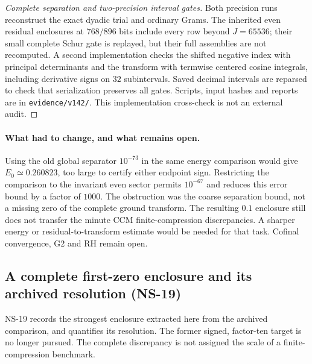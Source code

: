 \documentclass[11pt]{article}
\theoremstyle{remark}
\begin{document}
\begin{proof}[Complete separation and two-precision interval gates]
Both precision runs reconstruct the exact dyadic trial and ordinary
Grams. The inherited even residual enclosures at $768/896$ bits
include every row beyond $J=65536$; their small complete Schur gate
is replayed, but their full assemblies are not recomputed.
A second implementation checks the shifted negative index with
principal determinants and the transform with termwise centered
cosine integrals, including derivative signs on $32$ subintervals.
Saved decimal intervals are reparsed to check that serialization
preserves all gates. Scripts, input hashes and reports are in
\texttt{evidence/v142/}. This implementation cross-check is not an
external audit.
\end{proof}

\paragraph{What had to change, and what remains open.}
Using the old global separator $10^{-73}$ in the same energy comparison
would give $E_0\simeq0.260823$, too large to certify either endpoint
sign. Restricting the comparison to the invariant even sector permits
$10^{-67}$ and reduces this error bound by a factor of $1000$.
The obstruction was the coarse separation bound, not a missing zero
of the complete ground transform. The resulting $0.1$ enclosure
still does not transfer the minute CCM finite-compression discrepancies.
A sharper energy or residual-to-transform estimate would be needed
for that task. Cofinal convergence, G2 and RH remain open.


\subsection{A complete first-zero enclosure and its archived resolution (NS-19)}

NS-19 records the strongest enclosure extracted here from the archived
comparison, and quantifies its resolution. The former signed, factor-ten
target is no longer pursued. The complete discrepancy is not assigned the
scale of a finite-compression benchmark.
\end{document}
